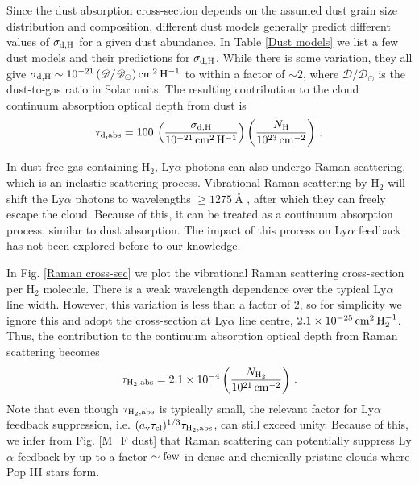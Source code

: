 \documentclass[fleqn,usenatbib]{mnras}
\newcommand{\taucl}{\tau_{\rm cl}}
\begin{document}
Since the dust absorption cross-section depends on the assumed dust grain size distribution and composition, different dust models generally predict different values of $\sigma_{\rm d,H}$ for a given dust abundance. In Table \ref{Dust models} we list a few dust models and their predictions for $\sigma_{\rm d,H}$. While there is some variation, they all give $\sigma_{\rm d,H} \sim 10^{-21} \, (\mathscr{D}/\mathscr{D}_{\odot}) \, \rm cm^{2} \, H^{-1}$ to within a factor of $\sim 2$, where $\mathscr{D}/\mathscr{D}_{\odot}$ is the dust-to-gas ratio in Solar units. The resulting contribution to the cloud continuum absorption optical depth from dust is
\begin{equation}
    \tau_{\rm d,abs} = 100 \, \left( \dfrac{\sigma_{\rm d,H}}{10^{-21} \, \rm cm^{2}\, H^{-1}} \right) \left( \dfrac{N_{\rm H}}{10^{23} \, \rm cm^{-2}}\right) \, \label{tau dust}.
\end{equation}

In dust-free gas containing H$_2$, Ly$\alpha$ photons can also undergo Raman scattering, which is an inelastic scattering process. Vibrational Raman scattering by H$_2$ will shift the Ly$\alpha$ photons to wavelengths $\geq 1275 ~ \textrm{Å}$ \citep{Dalgarno1962, Ford1973, Ford1973_2, Oklopcic2016}, after which they can freely escape the cloud. Because of this, it can be treated as a continuum absorption process, similar to dust absorption. The impact of this process on Ly$\alpha$ feedback has not been explored before to our knowledge. 

In Fig. \ref{Raman cross-sec} we plot the vibrational Raman scattering cross-section per H$_2$ molecule. There is a weak wavelength dependence over the typical Ly$\alpha$ line width. However, this variation is less than a factor of $2$, so for simplicity we ignore this and adopt the cross-section at Ly$\alpha$ line centre, $2.1 \times 10^{-25} \, \rm cm^{2} \, H_{2}^{-1}$. Thus, the contribution to the continuum absorption optical depth from Raman scattering becomes
\begin{equation}
    \tau_{\rm H_2, abs} = 2.1 \times 10^{-4} \left( \dfrac{N_{\rm H_2}}{10^{21} \, \rm cm^{-2}}\right) \, . \label{tau H2}
\end{equation}
Note that even though $\tau_{\rm H_2, abs}$ is typically small, the relevant factor for Ly$\alpha$ feedback suppression, i.e. $(a_{\rm v} \taucl)^{1/3} \tau_{\rm H_2, abs}$, can still exceed unity. Because of this, we infer from Fig. \ref{M_F dust} that Raman scattering can potentially suppress Ly$\alpha$ feedback by up to a factor $\sim \rm few$ in dense and chemically pristine clouds where Pop III stars form. 
\end{document}
